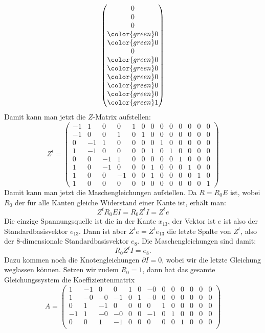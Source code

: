 \begin{loesung}
\[\begin{pmatrix}
              0\\
              0\\
              0\\
\color{green} 0\\
\color{green} 0\\
              0\\
\color{green} 0\\
\color{green} 0\\
\color{green} 0\\
\color{green} 0\\
\color{green} 0\\
\color{green} 1
\end{pmatrix}
\]
Damit kann man jetzt die $Z$-Matrix aufstellen:
\[
Z^t=\begin{pmatrix}
-1& 1& 0& 0& 1& 0& 0& 0& 0& 0& 0& 0& 0\\
-1& 0& 0& 1& 0& 1& 0& 0& 0& 0& 0& 0& 0\\
 0&-1& 1& 0& 0& 0& 0& 1& 0& 0& 0& 0& 0\\
 1&-1& 0& 0& 0& 0& 1& 0& 1& 0& 0& 0& 0\\
 0& 0&-1& 1& 0& 0& 0& 0& 0& 1& 0& 0& 0\\
 1& 0&-1& 0& 0& 0& 1& 0& 0& 0& 1& 0& 0\\
 1& 0& 0&-1& 0& 0& 1& 0& 0& 0& 0& 1& 0\\
 1& 0& 0& 0& 0& 0& 0& 0& 0& 0& 0& 0& 1
\end{pmatrix}
\]
Damit kann man jetzt die Maschengleichungen aufstellen. Da $R=R_0E$ ist,
wobei $R_0$ der für alle Kanten gleiche Widerstand einer Kante ist,
erhält man:
\[
Z^tR_0EI=R_0Z^tI=Z^te
\]
Die einzige Spannungsquelle ist die in der Kante $x_{13}$, der Vektor
ist $e$ ist also der Standardbasisvektor $e_{13}$. Dann ist aber
$Z^te=Z^te_{13}$ die letzte Spalte von $Z^t$, also der $8$-dimensionale
Standardbasisvektor $e_{8}$. Die Maschengleichungen sind damit:
\[
R_0Z^tI=e_8.
\]
Dazu kommen noch die Knotengleichungen $\partial I=0$, wobei wir die letzte
Gleichung weglassen können. Setzen wir zudem $R_0=1$, dann hat das
gesamte Gleichungssystem die Koeffizientenmatrix
\[
A=\begin{pmatrix}
   1& -1&  0&  0&  1&  0& -0&  0&  0&  0&  0&  0&  0\\
   1& -0& -0& -1&  0&  1& -0&  0&  0&  0&  0&  0&  0\\
   0&  1& -1&  0&  0&  0&  0&  1&  0&  0&  0&  0&  0\\
  -1&  1& -0& -0&  0&  0& -1&  0&  1&  0&  0&  0&  0\\
   0&  0&  1& -1&  0&  0&  0&  0&  0&  1&  0&  0&  0\\

\end{pmatrix}\]
\end{loesung}
